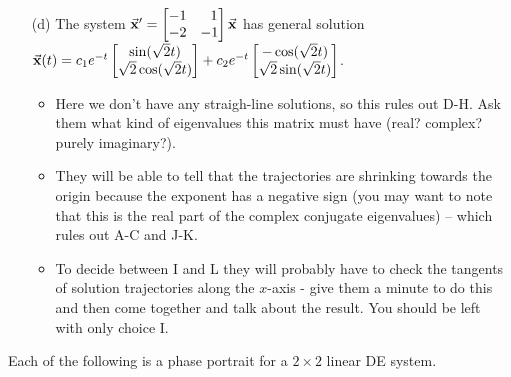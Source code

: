 \documentclass[epsf]{article}
\begin{document}
\begin{itemize}
\item[(d)] The system $\vec{\bf x}' = \begin{bmatrix}-1 & \ \ 1\cr -2 & -1 \end{bmatrix}\vec{\bf x}$ has general solution
$\vec{\bf x}(t) = c_1e^{-t}\begin{bmatrix}\sin(\sqrt{2}t) \cr\sqrt{2} \cos(\sqrt{2}t) \end{bmatrix} + c_2e^{-t}\begin{bmatrix}-\cos(\sqrt{2}t)\cr \sqrt{2}\sin(\sqrt{2}t) \end{bmatrix}$.

\begin{itemize}
\item  Here we don't have any straigh-line solutions, so this rules out D-H.  Ask them what kind of eigenvalues this matrix must have (real? complex? purely imaginary?).
\item  They will be able to tell that the trajectories are shrinking towards the origin because the exponent has a negative sign (you may want to note that this is the real part of the complex conjugate eigenvalues) -- which rules out A-C and J-K.  
\item To decide between I and L they will probably have to check the tangents of solution trajectories along the $x$-axis - give them a minute to do this and then come together and talk about the result.  You should be left with only choice I.
\end{itemize}

\end{itemize}

\newpage

Each of the following is a phase portrait for a $2\times 2$ linear DE system. \\
\end{document}
